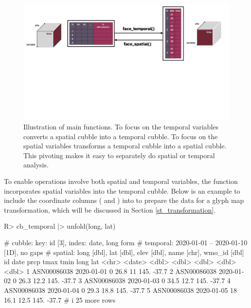 \documentclass[
  shortnames]{jss}
\begin{document}
\begin{CodeChunk}
\begin{figure}

{\centering \includegraphics[width=1\linewidth]{figures/diagram-keynotes/diagram-keynotes.001} 

}

\caption{Illustration of main functions. To focus on the temporal variables  converts a spatial cubble into a temporal cubble. To focus on the spatial variables  transforms a temporal cubble into a spatial cubble. This pivoting makes it easy to separately do spatial or temporal analysis.}\label{fig:face}
\end{figure}
\end{CodeChunk}

To enable operations involve both spatial and temporal variables, the function  incorporates spatial variables into the temporal cubble. Below is an example to include the coordinate columns ( and ) into  to prepare the data for a glyph map transformation, which will be discussed in Section \ref{st_transformation}.

\begin{CodeChunk}
\begin{CodeInput}
R> cb_temporal |> unfold(long, lat)
\end{CodeInput}
\begin{CodeOutput}
# cubble:   key: id [3], index: date, long form
# temporal: 2020-01-01 -- 2020-01-10 [1D], no gaps
# spatial:  long [dbl], lat [dbl], elev [dbl], name [chr], wmo_id [dbl]
  id          date        prcp  tmax  tmin  long   lat
  <chr>       <date>     <dbl> <dbl> <dbl> <dbl> <dbl>
1 ASN00086038 2020-01-01     0  26.8  11    145. -37.7
2 ASN00086038 2020-01-02     0  26.3  12.2  145. -37.7
3 ASN00086038 2020-01-03     0  34.5  12.7  145. -37.7
4 ASN00086038 2020-01-04     0  29.3  18.8  145. -37.7
5 ASN00086038 2020-01-05    18  16.1  12.5  145. -37.7
# i 25 more rows
\end{CodeOutput}
\end{CodeChunk}
\end{document}

